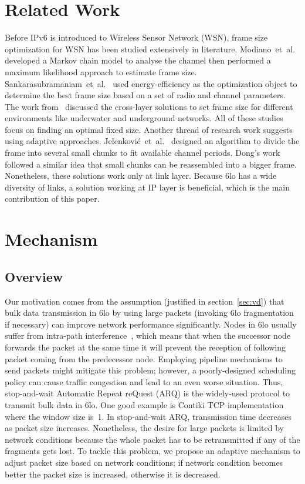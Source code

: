 \documentclass[runningheads,a4paper]{llncs}
\begin{document}
\section{Related Work}
Before IPv6 is introduced to Wireless Sensor Network (WSN), frame size optimization for WSN has been studied extensively in literature. Modiano~et~al.~\cite{Modi1999} developed a Markov chain model to analyse the channel then performed a maximum likelihood approach to estimate frame size. Sankarasubramaniam~et~al.~\cite{Sank2003} used energy-efficiency as the optimization object to determine the best frame size based on a set of radio and channel parameters. The work from~\cite{Vura2008} discussed the cross-layer solutions to set frame size for different environments like underwater and underground networks. All of these studies focus on finding an optimal fixed size. Another thread of research work suggests using adaptive approaches. Jelenkovi\'{c}~et~al.~\cite{Jele2008} designed an algorithm to divide the frame into several small chunks to fit available channel periods. Dong's work~\cite{Dong2010} followed a similar idea that small chunks can be reassembled into a bigger frame. Nonetheless, these solutions work only at link layer. Because 6lo has a wide diversity of links, a solution working at IP layer is beneficial, which is the main contribution of this paper.

\section{Mechanism}

\subsection{Overview}\label{sec:ov}
Our motivation comes from the assumption (justified in section~\ref{sec:vd}) that bulk data transmission in 6lo by using large packets (invoking 6lo fragmentation if necessary) can improve network performance significantly. Nodes in 6lo usually suffer from intra-path interference~\cite{Kim2007}, which means that when the successor node forwards the packet at the same time it will prevent the reception of following packet coming from the predecessor node. Employing pipeline mechanisms to send packets might mitigate this problem; however, a poorly-designed scheduling policy can cause traffic congestion and lead to an even worse situation. Thus, stop-and-wait Automatic Repeat reQuest (ARQ) is the widely-used protocol to transmit bulk data in 6lo. One good example is Contiki TCP implementation where the window size is~1. In stop-and-wait ARQ, transmission time decreases as packet size increases. Nonetheless, the desire for large packets is limited by network conditions because the whole packet has to be retransmitted if any of the fragments gets lost. To tackle this problem, we propose an adaptive mechanism to adjust packet size based on network conditions; if network condition becomes better the packet size is increased, otherwise it is decreased.
\end{document}
